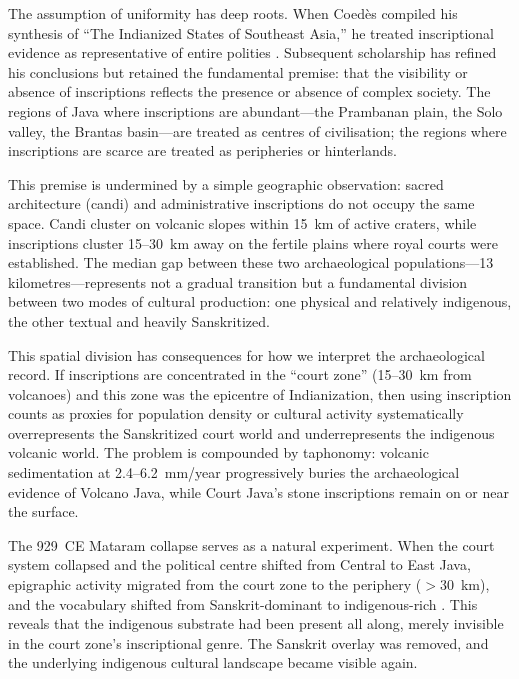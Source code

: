 \documentclass[12pt]{article}
\begin{document}
The assumption of uniformity has deep roots.
When Coed\`{e}s compiled his synthesis of ``The Indianized States of Southeast Asia,'' he treated inscriptional evidence as representative of entire polities \citep{Coedes1968}.
Subsequent scholarship has refined his conclusions but retained the fundamental premise: that the visibility or absence of inscriptions reflects the presence or absence of complex society.
The regions of Java where inscriptions are abundant---the Prambanan plain, the Solo valley, the Brantas basin---are treated as centres of civilisation; the regions where inscriptions are scarce are treated as peripheries or hinterlands.

This premise is undermined by a simple geographic observation: sacred architecture (candi) and administrative inscriptions do not occupy the same space.
Candi cluster on volcanic slopes within 15~km of active craters, while inscriptions cluster 15--30~km away on the fertile plains where royal courts were established.
The median gap between these two archaeological populations---13 kilometres---represents not a gradual transition but a fundamental division between two modes of cultural production: one physical and relatively indigenous, the other textual and heavily Sanskritized.

This spatial division has consequences for how we interpret the archaeological record.
If inscriptions are concentrated in the ``court zone'' (15--30~km from volcanoes) and this zone was the epicentre of Indianization, then using inscription counts as proxies for population density or cultural activity systematically overrepresents the Sanskritized court world and underrepresents the indigenous volcanic world.
The problem is compounded by taphonomy: volcanic sedimentation at 2.4--6.2~mm/year progressively buries the archaeological evidence of Volcano Java, while Court Java's stone inscriptions remain on or near the surface.

The 929~CE Mataram collapse serves as a natural experiment.
When the court system collapsed and the political centre shifted from Central to East Java, epigraphic activity migrated from the court zone to the periphery ($>$30~km), and the vocabulary shifted from Sanskrit-dominant to indigenous-rich \citep{Christie2001}.
This reveals that the indigenous substrate had been present all along, merely invisible in the court zone's inscriptional genre.
The Sanskrit overlay was removed, and the underlying indigenous cultural landscape became visible again.
\end{document}
